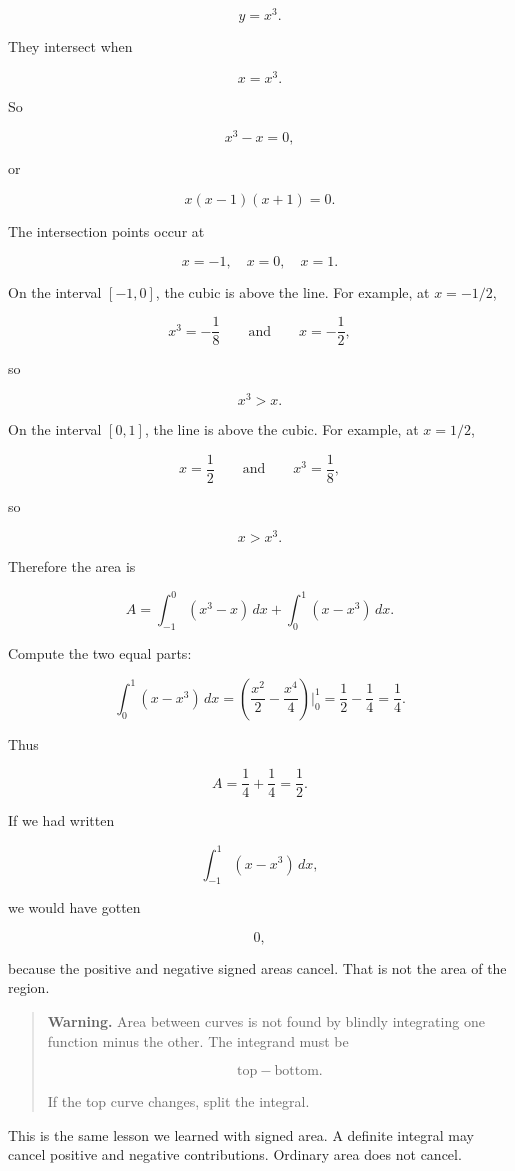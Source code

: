 \[
y=x^3.
\]

They intersect when

\[
x=x^3.
\]

So

\[
x^3-x=0,
\]

or

\[
x(x-1)(x+1)=0.
\]

The intersection points occur at

\[
x=-1,\quad x=0,\quad x=1.
\]

On the interval \([-1,0]\), the cubic is above the line.  For example, at \(x=-1/2\),

\[
x^3=-\frac18
\qquad\text{and}\qquad
x=-\frac12,
\]

so

\[
x^3>x.
\]

On the interval \([0,1]\), the line is above the cubic.  For example, at \(x=1/2\),

\[
x=\frac12
\qquad\text{and}\qquad
x^3=\frac18,
\]

so

\[
x>x^3.
\]

Therefore the area is

\[
A
=
\int_{-1}^0 (x^3-x)\,dx
+
\int_0^1 (x-x^3)\,dx.
\]

Compute the two equal parts:

\[
\int_0^1 (x-x^3)\,dx
=
\left(\frac{x^2}{2}-\frac{x^4}{4}\right)\Big|_0^1
=
\frac12-\frac14
=
\frac14.
\]

Thus

\[
A=\frac14+\frac14=\boxed{\frac12}.
\]

If we had written

\[
\int_{-1}^1 (x-x^3)\,dx,
\]

we would have gotten

\[
0,
\]

because the positive and negative signed areas cancel.  That is not the area of the
region.

\begin{quote}
\textbf{Warning.}
Area between curves is not found by blindly integrating one function minus the other.
The integrand must be

\[
\text{top}-\text{bottom}.
\]

If the top curve changes, split the integral.
\end{quote}

This is the same lesson we learned with signed area.  A definite integral may cancel
positive and negative contributions.  Ordinary area does not cancel.


